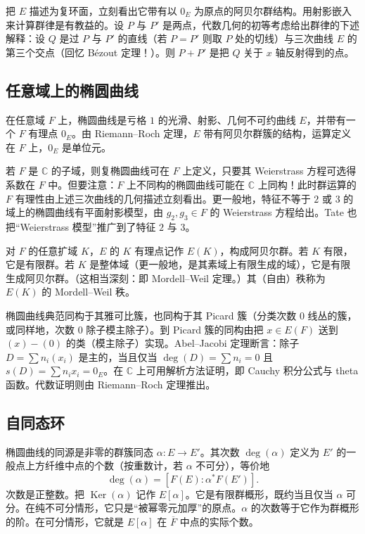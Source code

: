 把 $E$ 描述为复环面，立刻看出它带有以 $0_E$ 为原点的阿贝尔群结构。用射影嵌入来计算群律是有教益的。设 $P$ 与 $P'$ 是两点，代数几何的初等考虑给出群律的下述解释：设 $Q$ 是过 $P$ 与 $P'$ 的直线（若 $P=P'$ 则取 $P$ 处的切线）与三次曲线 $E$ 的第三个交点（回忆 Bézout 定理！）。则 $P+P'$ 是把 $Q$ 关于 $x$ 轴反射得到的点。

\subsection{任意域上的椭圆曲线}\label{c5:sec:1.2}

在任意域 $F$ 上，椭圆曲线是亏格 $1$ 的光滑、射影、几何不可约曲线 $E$，并带有一个 $F$ 有理点 $0_E$。由 Riemann--Roch 定理，$E$ 带有阿贝尔群簇的结构，运算定义在 $F$ 上，$0_E$ 是单位元。

若 $F$ 是 $\mathbb{C}$ 的子域，则复椭圆曲线可在 $F$ 上定义，只要其 Weierstrass 方程可选得系数在 $F$ 中。但要注意：$F$ 上不同构的椭圆曲线可能在 $\mathbb{C}$ 上同构！此时群运算的 $F$ 有理性由上述三次曲线的几何描述立刻看出。更一般地，特征不等于 $2$ 或 $3$ 的域上的椭圆曲线有平面射影模型，由 $g_2,g_3\in F$ 的 Weierstrass 方程给出。Tate 也把“Weierstrass 模型”推广到了特征 $2$ 与 $3$。

对 $F$ 的任意扩域 $K$，$E$ 的 $K$ 有理点记作 $E(K)$，构成阿贝尔群。若 $K$ 有限，它是有限群。若 $K$ 是整体域（更一般地，是其素域上有限生成的域），它是有限生成阿贝尔群。（这相当深刻：即 Mordell--Weil 定理。）其（自由）秩称为 $E(K)$ 的 Mordell--Weil 秩。

椭圆曲线典范同构于其雅可比簇，也同构于其 Picard 簇（分类次数 $0$ 线丛的簇，或同样地，次数 $0$ 除子模主除子）。到 Picard 簇的同构由把 $x\in E(F)$ 送到 $(x)-(0)$ 的类（模主除子）实现。Abel--Jacobi 定理断言：除子 $D=\sum n_i(x_i)$ 是主的，当且仅当 $\deg(D)=\sum n_i=0$ 且 $s(D)=\sum n_ix_i=0_E$。在 $\mathbb{C}$ 上可用解析方法证明，即 Cauchy 积分公式与 theta 函数。代数证明则由 Riemann--Roch 定理推出。

\subsection{自同态环}\label{c5:sec:1.3}

椭圆曲线的同源是非零的群簇同态 $\alpha\colon E\to E'$。其次数 $\deg(\alpha)$ 定义为 $E'$ 的一般点上方纤维中点的个数（按重数计，若 $\alpha$ 不可分），等价地
\begin{equation}\tag{1.9}\label{c5:eq:1.9}
\deg(\alpha)=[F(E):\alpha^*F(E')].
\end{equation}
次数是正整数。把 $\operatorname{Ker}(\alpha)$ 记作 $E[\alpha]$。它是有限群概形，既约当且仅当 $\alpha$ 可分。在纯不可分情形，它只是“被幂零元加厚”的原点。$\alpha$ 的次数等于它作为群概形的阶。在可分情形，它就是 $E[\alpha]$ 在 $\overline{F}$ 中点的实际个数。

